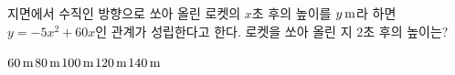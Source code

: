 지면에서 수직인 방향으로 쏘아 올린 로켓의 $x$초 후의 높이를 $y\mkern3mu \mathrm{m}$라 하면 $y=-5x^2+60x$인 관계가 성립한다고 한다. 로켓을 쏘아 올린 지 $2$초 후의 높이는?
\begin{choices32}{$60\mkern3mu \mathrm{m}$}{$80\mkern3mu \mathrm{m}$}{$100\mkern3mu \mathrm{m}$}{$120\mkern3mu \mathrm{m}$}{$140\mkern3mu \mathrm{m}$}\end{choices32}

